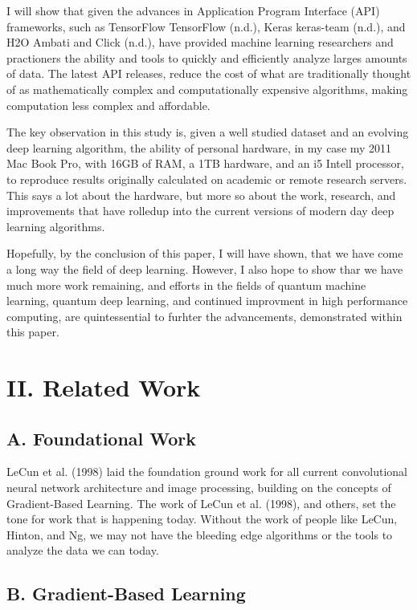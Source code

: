\documentclass[conference,final,]{IEEEtran}
\begin{document}
I will show that given the advances in Application Program Interface
(API) frameworks, such as TensorFlow TensorFlow (n.d.), Keras keras-team
(n.d.), and H2O Ambati and Click (n.d.), have provided machine learning
researchers and practioners the ability and tools to quickly and
efficiently analyze larges amounts of data. The latest API releases,
reduce the cost of what are traditionally thought of as mathematically
complex and computationally expensive algorithms, making computation
less complex and affordable.

The key observation in this study is, given a well studied dataset and
an evolving deep learning algorithm, the ability of personal hardware,
in my case my 2011 Mac Book Pro, with 16GB of RAM, a 1TB hardware, and
an i5 Intell processor, to reproduce results originally calculated on
academic or remote research servers. This says a lot about the hardware,
but more so about the work, research, and improvements that have
rolledup into the current versions of modern day deep learning
algorithms.

Hopefully, by the conclusion of this paper, I will have shown, that we
have come a long way the field of deep learning. However, I also hope to
show thar we have much more work remaining, and efforts in the fields of
quantum machine learning, quantum deep learning, and continued
improvment in high performance computing, are quintessential to furhter
the advancements, demonstrated within this paper.

\section{II. Related Work}\label{ii.-related-work}

\subsection{A. Foundational Work}\label{a.-foundational-work}

LeCun et al. (1998) laid the foundation ground work for all current
convolutional neural network architecture and image processing, building
on the concepts of Gradient-Based Learning. The work of LeCun et al.
(1998), and others, set the tone for work that is happening today.
Without the work of people like LeCun, Hinton, and Ng, we may not have
the bleeding edge algorithms or the tools to analyze the data we can
today.

\subsection{B. Gradient-Based
Learning}\label{b.-gradient-based-learning}
\end{document}
